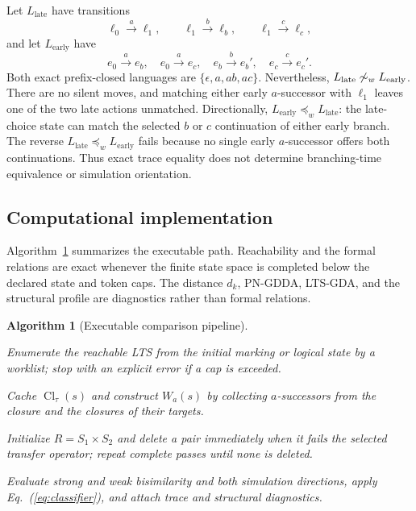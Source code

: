 \documentclass{ws-jbcb}
\newtheorem{algorithm}{Algorithm}
\numberwithin{equation}{section}
\newcommand{\TAU}{\tau}
\newcommand{\weaksim}{\mathrel{\sim_{w}}}
\newcommand{\weakpre}{\mathrel{\preceq_{w}}}
\begin{document}
\begin{example}\label{ex:branching}
Let $L_{\mathrm{late}}$ have transitions
\begin{equation}\label{eq:late-choice}
 \ell_0\xrightarrow{a}\ell_1,\qquad
 \ell_1\xrightarrow{b}\ell_b,\qquad
 \ell_1\xrightarrow{c}\ell_c,
\end{equation}
and let $L_{\mathrm{early}}$ have
\begin{equation}\label{eq:early-choice}
 e_0\xrightarrow{a}e_b,\quad e_0\xrightarrow{a}e_c,\quad
 e_b\xrightarrow{b}e_b',\quad e_c\xrightarrow{c}e_c'.
\end{equation}
Both exact prefix-closed languages are
$\{\epsilon,a,ab,ac\}$. Nevertheless,
$L_{\mathrm{late}}\not\weaksim L_{\mathrm{early}}$. There are no silent moves,
and matching either early $a$-successor with $\ell_1$ leaves one of the two
late actions unmatched. Directionally,
$L_{\mathrm{early}}\weakpre L_{\mathrm{late}}$: the late-choice state can match
the selected $b$ or $c$ continuation of either early branch. The reverse
$L_{\mathrm{late}}\weakpre L_{\mathrm{early}}$ fails because no single early
$a$-successor offers both continuations. Thus exact trace equality does not
determine branching-time equivalence or simulation orientation.
\end{example}

\subsection{Computational implementation}\label{sec:algorithms}

Algorithm~\ref{alg:pipeline} summarizes the executable path. Reachability and
the formal relations are exact whenever the finite state space is completed
below the declared state and token caps. The distance $d_k$, PN-GDDA, LTS-GDA,
and the structural profile are diagnostics rather than formal relations.

\begin{algorithm}[Executable comparison pipeline]\label{alg:pipeline}
\begin{romanlist}[(iv)]
\item Enumerate the reachable LTS from the initial marking or logical state by a
worklist; stop with an explicit error if a cap is exceeded.
\item Cache $\operatorname{Cl}_{\TAU}(s)$ and construct $W_a(s)$ by collecting
$a$-successors from the closure and the closures of their targets.
\item Initialize $R=S_1\times S_2$ and delete a pair immediately when it fails
the selected transfer operator; repeat complete passes until none is deleted.
\item Evaluate strong and weak bisimilarity and both simulation directions,
apply Eq.~(\ref{eq:classifier}), and attach trace and structural diagnostics.
\end{romanlist}
\end{algorithm}
\end{document}
